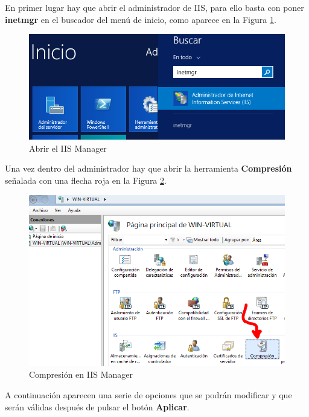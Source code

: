 En primer lugar hay que abrir el administrador de IIS\cite{enlace11}, para ello basta con poner \textbf{inetmgr} en el buscador del menú de inicio, como aparece en la Figura \ref{fig:figura5-4}.
	\begin{figure}[H] %
		\centering
		\includegraphics[scale=0.8]{figuras/ejercicio5/figura5-4.png} 
		\caption{Abrir el IIS Manager} 
		\label{fig:figura5-4}
	\end{figure}

Una vez dentro del administrador hay que abrir la herramienta \textbf{Compresión} señalada con una flecha roja en la Figura \ref{fig:figura5-5}.
	\begin{figure}[H] %
		\centering
		\includegraphics[scale=0.8]{figuras/ejercicio5/figura5-5.png} 
		\caption{Compresión en IIS Manager} 
		\label{fig:figura5-5}
	\end{figure}

A continuación aparecen una serie de opciones que se podrán modificar y que serán válidas después de pulsar el botón \textbf{Aplicar}.
\\

